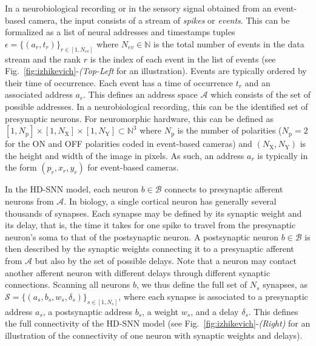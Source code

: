 \documentclass[default]{sn-jnl}%
\theoremstyle{thmstyleone}%
\theoremstyle{thmstyletwo}%
\theoremstyle{thmstylethree}%
\newcommand{\seeFig}[1]{see Fig.~\ref{fig:#1}}%
\newcommand{\presynaddr}{a} %
\newcommand{\postsynaddr}{b} %
\newcommand{\numevent}{N_{ev}} %
\newcommand{\presynaddrspace}{\mathcal{A}} %
\newcommand{\postsynaddrspace}{\mathcal{B}} %
\newcommand{\Npol}{N_\text{p}} %
\newcommand{\arank}{r} %
\newcommand{\synapse}{\mathcal{S}} %
\newcommand{\synapticweight}{w} %
\newcommand{\synapticdelay}{\delta} %
\newcommand{\ranksyn}{s} %
\newcommand{\Nsyn}{N_{s}} %
\newcommand{\timev}{t} %
\newcommand{\polev}{p} %
\newcommand{\event}{\epsilon} %
\newcommand{\Nx}{N_\text{X}}
\newcommand{\Ny}{N_\text{Y}}
\begin{document}
In a neurobiological recording or in the sensory signal obtained from an event-based camera, the input consists of a stream of \emph{spikes} or \emph{events}. This can be formalized as a list of neural addresses and timestamps tuples $\event = \{(\presynaddr_\arank, \timev_\arank)\}_{\arank \in [1,\numevent]}$ where $\numevent \in \mathbb{N} $ is the total number of events in the data stream and the rank $\arank$ is the index of each event in the list of events (\seeFig{izhikevich}-\textit{(Top-Left} for an illustration). Events are typically ordered by their time of occurrence. Each event has a time of occurrence $\timev_\arank$ and an associated address $\presynaddr_\arank$. This defines an address space $\presynaddrspace$ which consists of the set of possible addresses. In a neurobiological recording, this can be the identified set of presynaptic neurons. For neuromorphic hardware, this can be defined as $[1, \Npol] \times [1, \Nx]\times[1, \Ny] \subset \mathbb{N}^3$ where $\Npol$ is the number of polarities ($\Npol=2$ for the ON and OFF polarities coded in event-based cameras) and $(\Nx, \Ny)$ is the height and width of the image in pixels. As such, an address $\presynaddr_\arank$ is typically in the form $(\polev_\arank, x_\arank, y_\arank)$ for event-based cameras.

In the HD-SNN model, each neuron $\postsynaddr \in \postsynaddrspace$ connects to presynaptic afferent neurons from $\presynaddrspace$. In biology, a single cortical neuron has generally several thousands of synapses. Each synapse may be defined by its synaptic weight and its delay, that is, the time it takes for one spike to travel from the presynaptic neuron's soma to that of the postsynaptic neuron. A postsynaptic neuron $\postsynaddr \in \postsynaddrspace$ is then described by the synaptic weights connecting it to a presynaptic afferent from $\presynaddrspace$ but also by the set of possible delays. Note that a neuron may contact another afferent neuron with different delays through different synaptic connections. Scanning all neurons $\postsynaddr$, we thus define the full set of $\Nsyn$ synapses, 
as $\synapse = \{(\presynaddr_\ranksyn, \postsynaddr_\ranksyn, \synapticweight_\ranksyn, \synapticdelay_\ranksyn)\}_{\ranksyn \in [1,\Nsyn]}$, where each synapse is associated to a presynaptic address $\presynaddr_\ranksyn$, a postsynaptic address $\postsynaddr_\ranksyn$, a weight $\synapticweight_\ranksyn$, and a delay $\synapticdelay_\ranksyn$. This defines the full connectivity of the HD-SNN model (\seeFig{izhikevich}-\textit{(Right)} for an illustration of the connectivity of one neuron with synaptic weights and delays). 
\end{document}
